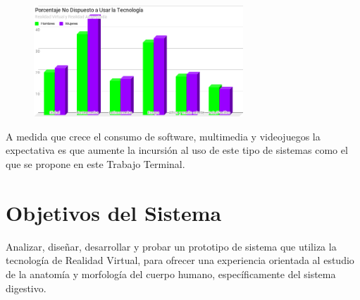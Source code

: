 \begin{figure}[H]
	\begin{center}
 		\includegraphics[width = 0.7\textwidth]{v3/images/chart1.png}
	\end{center} 
\end{figure}
A medida que crece el consumo de software, multimedia y videojuegos la expectativa es que aumente la incursión al uso de este tipo  de sistemas como el que se propone en este Trabajo Terminal.



\section{Objetivos del Sistema}
Analizar, diseñar, desarrollar y probar un prototipo de sistema que utiliza la tecnología de Realidad Virtual, para ofrecer una experiencia orientada al estudio 
de la anatomía y morfología del cuerpo humano, específicamente del sistema digestivo.\\
